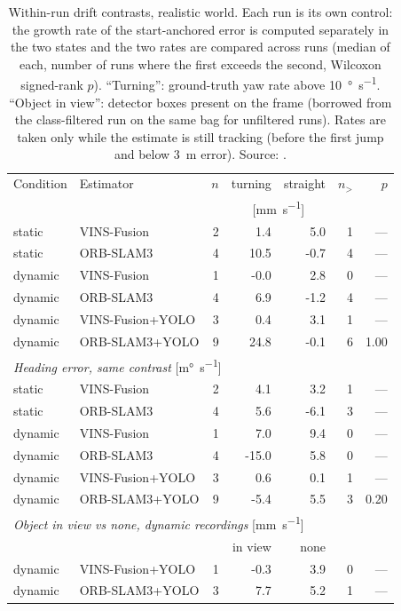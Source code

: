 \begin{table}[htbp]
\centering
\small
\caption[Within-run drift contrasts, realistic world.]{Within-run drift contrasts, realistic world. Each run is its own control: the growth rate of the start-anchored error is computed separately in the two states and the two rates are compared across runs (median of each, number of runs where the first exceeds the second, Wilcoxon signed-rank $p$). ``Turning'': ground-truth yaw rate above \SI{10}{\degree\per\second}. ``Object in view'': detector boxes present on the frame (borrowed from the class-filtered run on the same bag for unfiltered runs). Rates are taken only while the estimate is still tracking (before the first jump and below \SI{3}{\metre} error). Source: .}
\label{tab:insight-contrast-realistic}
\begin{tabular}{llrrrrr}
\toprule
Condition & Estimator & $n$ & turning & straight & $n_{>}$ & $p$ \\
 & & & \multicolumn{2}{c}{[\si{\milli\metre\per\second}]} & & \\
\midrule
static & VINS-Fusion & 2 & 1.4 & 5.0 & 1 & --- \\
static & ORB-SLAM3 & 4 & 10.5 & -0.7 & 4 & --- \\
dynamic & VINS-Fusion & 1 & -0.0 & 2.8 & 0 & --- \\
dynamic & ORB-SLAM3 & 4 & 6.9 & -1.2 & 4 & --- \\
dynamic & VINS-Fusion+YOLO & 3 & 0.4 & 3.1 & 1 & --- \\
dynamic & ORB-SLAM3+YOLO & 9 & 24.8 & -0.1 & 6 & 1.00 \\
\midrule
\multicolumn{7}{l}{\emph{Heading error, same contrast} [\si{\milli\degree\per\second}]} \\
static & VINS-Fusion & 2 & 4.1 & 3.2 & 1 & --- \\
static & ORB-SLAM3 & 4 & 5.6 & -6.1 & 3 & --- \\
dynamic & VINS-Fusion & 1 & 7.0 & 9.4 & 0 & --- \\
dynamic & ORB-SLAM3 & 4 & -15.0 & 5.8 & 0 & --- \\
dynamic & VINS-Fusion+YOLO & 3 & 0.6 & 0.1 & 1 & --- \\
dynamic & ORB-SLAM3+YOLO & 9 & -5.4 & 5.5 & 3 & 0.20 \\
\midrule
\multicolumn{7}{l}{\emph{Object in view vs none, dynamic recordings} [\si{\milli\metre\per\second}]} \\
 & & & in view & none & & \\
dynamic & VINS-Fusion+YOLO & 1 & -0.3 & 3.9 & 0 & --- \\
dynamic & ORB-SLAM3+YOLO & 3 & 7.7 & 5.2 & 1 & --- \\
\bottomrule
\end{tabular}
\end{table}
